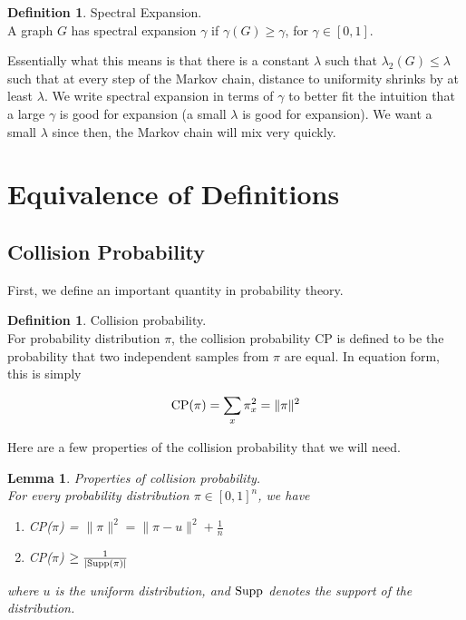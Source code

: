 \documentclass[11pt]{article}
\newtheorem{lemma}[theorem]{Lemma}
\theoremstyle{definition}
\newtheorem{definition}[theorem]{Definition}
\theoremstyle{definition}
\theoremstyle{definition}
\newcommand{\txt}[1]
{\textnormal{#1}}
\begin{document}
\begin{definition} Spectral Expansion. \\
A graph $G$ has spectral expansion $\gamma$ if 
$\gamma(G) \geq \gamma$, for $\gamma \in [0, 1]$. 
\end{definition}

Essentially what this means is that there is a constant $\lambda$ such that $\lambda_2(G) \leq \lambda$ such that at every step of the Markov chain, distance to uniformity shrinks by at least $\lambda$. We write spectral expansion in terms of $\gamma$ to better fit the intuition that a large $\gamma$ is good for expansion (a small $\lambda$ is good for expansion). We want a small $\lambda$ since then, the Markov chain will mix very quickly. 




\section{Equivalence of Definitions}


\subsection{Collision Probability}
First, we define an important quantity in probability theory. 

\begin{definition} Collision probability. \\
For probability distribution $\pi$, the collision probability CP is 
defined to be the probability that two independent samples from $\pi$
are equal. In equation form, this is simply

\[ 
\txt{CP}(\pi) = \sum_x \pi_x^2 = \|\pi\|^2
\]
\end{definition}

Here are a few properties of the collision probability that we will need. 

\begin{lemma} Properties of collision probability. \\
For every probability distribution $\pi \in [0, 1]^{n}$, we have
\begin{enumerate}

\item CP($\pi$) = $\|\pi\|^2 = \|\pi - u\|^2 + \frac{1}{n}$

\item CP($\pi$) $\geq \frac{1}{|\txt{Supp}(\pi)|}$ 
\end{enumerate}

where $u$ is the uniform distribution, and $\txt{Supp}$ denotes the support of the distribution.
\end{lemma}
\end{document}
